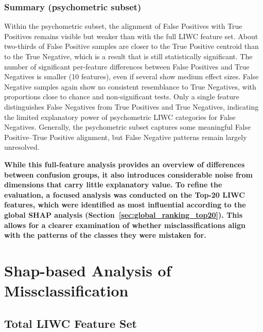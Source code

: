 \subsubsection{Summary (psychometric subset)}
Within the psychometric subset, the alignment of False Positives with True Positives remains visible but weaker than with the full LIWC feature set. About two-thirds of False Positive samples are closer to the True Positive centroid than to the True Negative, which is a result that is still statistically significant. The number of significant per-feature differences between False Positives and True Negatives is smaller (10 features), even if several show medium effect sizes. False Negative samples again show no consistent resemblance to True Negatives, with proportions close to chance and non-significant tests. Only a single feature distinguishes False Negatives from True Positives and True Negatives, indicating the limited explanatory power of psychometric LIWC categories for False Negatives. Generally, the psychometric subset captures some meaningful False Positive–True Positive alignment, but False Negative patterns remain largely unresolved.


\textbf{While this full-feature analysis provides an overview of differences between confusion groups, it also introduces considerable noise from dimensions that carry little explanatory value. To refine the evaluation, a focused analysis was conducted on the Top-20 LIWC features, which were identified as most influential according to the global SHAP analysis (Section~\ref{sec:global_ranking_top20}). 
This allows for a clearer examination of whether misclassifications 
align with the patterns of the classes they were mistaken for.}


\section{Shap-based Analysis of Missclassification} \label{sec:shap_missclassification_analysis} 

\subsection{Total LIWC Feature Set}


